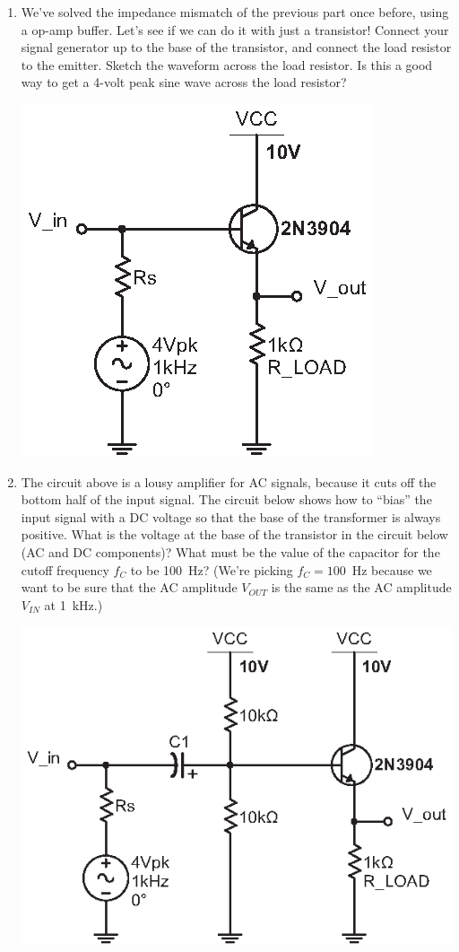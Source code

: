 \begin{enumerate}[wide]
\item We've solved the impedance mismatch of the previous part once before, using a op-amp buffer.  Let's see if we can do it with just a transistor!  Connect your signal generator up to the base of the transistor, and connect the load resistor to the emitter.  Sketch the waveform across the load resistor.  Is this a good way to get a 4-volt peak sine wave across the load resistor?
\begin{center}
\includegraphics{bjt/ac_with_emit_follower.eps}
\end{center}

\item The circuit above is a lousy amplifier for AC signals, because it cuts off the bottom half of the input signal.  The circuit below shows how to ``bias'' the input signal with a DC voltage so that the base of the transformer is always positive.  What is the voltage at the base of the transistor in the circuit below (AC and DC components)?  What must be the value of the capacitor for the cutoff frequency $f_C$ to be 100~Hz?  (We're picking $f_C=100$~Hz because we want to be sure that the AC amplitude $V_{OUT}$ is the same as the AC amplitude $V_{IN}$ at 1~kHz.)
\begin{center}
\includegraphics{bjt/emit_follower_biased_input.eps}
\end{center}


\end{enumerate}
